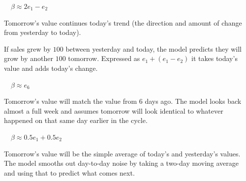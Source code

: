 \documentclass[12pt]{article}
\newcommand{\vsp}{\vspace*{1em}}
\newcommand{\snl}{\vspace*{2pt}}
\begin{document}
{ \ \ $\beta \approx 2e_1 - e_2$}\snl

Tomorrow's value continues today's trend (the direction and amount of
change from yesterday to today).

If sales grew by $100$ between yesterday and today, the model predicts
they will grow by another $100$ tomorrow. Expressed as
$e_1 + (e_1 - e_2)$ it takes today's value and adds today's change.

\vsp

{ \ \ $\beta \approx e_6$}\snl

Tomorrow's value will match the value from 6 days ago.
The model looks back almost a full week and assumes tomorrow will look
identical to whatever happened on that same day earlier in the cycle.

\vsp

{ \ \ $\beta \approx 0.5e_1 + 0.5e_2$}\snl

Tomorrow's value will be the simple average of today's and yesterday's values.
The model smooths out day-to-day noise by taking a two-day moving average and
using that to predict what comes next.
\end{document}
